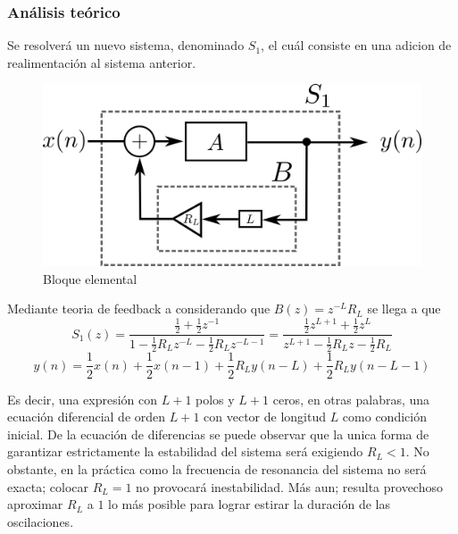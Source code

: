 \documentclass[assd_tp2_main.tex]{subfiles}
\begin{document}
\subsubsection{Análisis teórico}
Se resolverá un nuevo sistema, denominado $S_1$, el cuál consiste en una adicion de realimentación al sistema anterior.
\begin{figure}[H]	
	\centering
	\includegraphics[scale=1]{graficos/bloque2ej5.png}
	\caption{Bloque elemental}
	\label{fig:bloqueElemental}
\end{figure}

Mediante teoria de feedback a considerando que $B(z)=z^{-L}R_L$ se llega a que
\begin{equation}
S_1(z)=\frac{\frac{1}{2}+\frac{1}{2}z^{-1}}{1-\frac{1}{2}R_Lz^{-L}-\frac{1}{2}R_Lz^{-L-1}}=\frac{ \frac{1}{2} z^{L+1} + \frac{1}{2}z^L}{ z^{L+1} - \frac{1}{2}R_L z-\frac{1}{2}R_L } 
\end{equation}
\begin{equation}
y(n)=\frac{1}{2}x(n)+\frac{1}{2}x(n-1)+\frac{1}{2}R_Ly(n-L)+\frac{1}{2}R_Ly(n-L-1)
\end{equation}

Es decir, una expresión con $L+1$ polos y $L+1$ ceros, en otras palabras, una ecuación diferencial de orden $L+1$ con vector de longitud $L$ como condición inicial. De la ecuación de diferencias se puede observar que la unica forma de garantizar estrictamente la estabilidad del sistema será exigiendo $R_L<1$. No obstante, en la práctica como la frecuencia de resonancia del sistema no será exacta; colocar $R_L=1$ no provocará inestabilidad. Más aun; resulta provechoso aproximar $R_L$ a $1$ lo más posible para lograr estirar la duración de las oscilaciones.   
\end{document}
